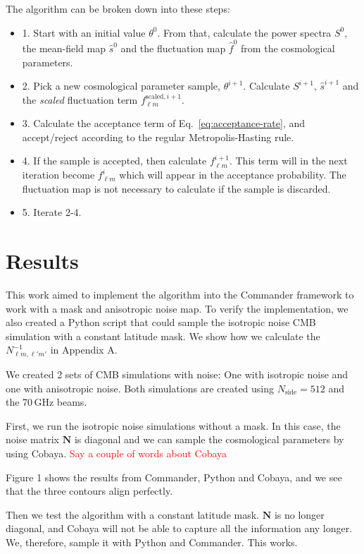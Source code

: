 \documentclass[twocolumn]{../common/aa}
\begin{document}
The algorithm can be broken down into these steps:
\begin{itemize}
    \item 1. Start with an initial value $\theta^0$. From that, calculate the power spectra $S^0$, the mean-field map $\hat{s}^0$ and the fluctuation map $\hat{f}^0$ from the cosmological parameters.
    \item 2. Pick a new cosmological parameter sample, $\theta^{i+1}$. Calculate $S^{i+1}$, $\hat{s}^{i+1}$ and the \textit{scaled} fluctuation term $f_{\ell m}^{\textrm{scaled}, i+1}$.
    \item 3. Calculate the acceptance term of Eq.~\ref{eq:acceptance-rate}, and accept/reject according to the regular Metropolis-Hasting rule.
    \item 4. If the sample is accepted, then calculate $f_{\ell m}^{i+1}$. This term will in the next iteration become $f_{\ell m}^{i}$ which will appear in the acceptance probability. The fluctuation map is not necessary to calculate if the sample is discarded.
    \item 5. Iterate 2-4.
\end{itemize}


\section{Results}
\label{sec:results}

This work aimed to implement the algorithm into the Commander framework to work with a mask and anisotropic noise map. To verify the implementation, we also created a Python script that could sample the isotropic noise CMB simulation with a constant latitude mask. We show how we calculate the $N^{-1}_{\ell m, \ell' m'}$ in Appendix A.

We created 2 sets of CMB simulations with noise: One with isotropic noise and one with anisotropic noise. Both simulations are created using $N_{\textrm{side}}=512$ and the 70\,GHz beams.

First, we run the isotropic noise simulations without a mask. In this case, the noise matrix $\textbf{N}$ is diagonal and we can sample the cosmological parameters by using Cobaya. \textcolor{red}{Say a couple of words about Cobaya}

Figure 1 shows the results from Commander, Python and Cobaya, and we see that the three contours align perfectly.

Then we test the algorithm with a constant latitude mask. $\textbf{N}$ is no longer diagonal, and Cobaya will not be able to capture all the information any longer. We, therefore, sample it with Python and Commander. This works.
\end{document}
